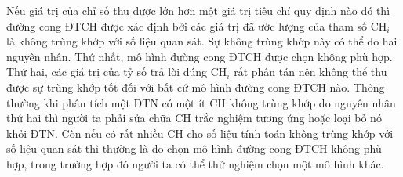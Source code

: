 Nếu giá trị của chỉ số thu được lớn hơn một giá trị tiêu chí quy định nào đó thì đường cong ĐTCH được xác định bởi các giá trị đã ước lượng của tham số CH$_i$ là không trùng khớp với số liệu quan sát. Sự không trùng khớp này có thể do hai nguyên nhân. Thứ nhất, mô hình đường cong ĐTCH được chọn không phù hợp. Thứ hai, các giá trị của tỷ số trả lời đúng CH$_i$ rất phân tán nên không thể thu được sự trùng khớp tốt đối với bất cứ mô hình đường cong ĐTCH nào. Thông thường khi phân tích một ĐTN có một ít CH không trùng khớp do nguyên nhân thứ hai thì người ta phải sửa chữa CH trắc nghiệm tương ứng hoặc loại bỏ nó khỏi ĐTN. Còn nếu có rất nhiều CH cho số liệu tính toán không trùng khớp với số liệu quan sát thì thường là do chọn mô hình đường cong ĐTCH không phù hợp, trong trường hợp đó người ta có thể thử nghiệm chọn một mô hình khác.


